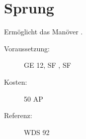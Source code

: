 \section{Sprung}
\label{sf.sprung}
Ermöglicht das Manöver .
\begin{description}
    \item[Voraussetzung:]
        GE 12, SF , SF 
    \item [Kosten:]
        50 AP
    \item [Referenz:]
        WDS 92
\end{description}
